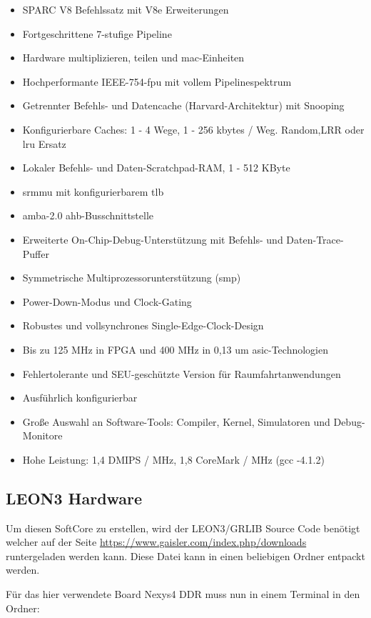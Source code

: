 \begin{itemize}
  \item SPARC V8 Befehlssatz mit V8e Erweiterungen
\item Fortgeschrittene 7-stufige Pipeline
\item Hardware multiplizieren, teilen und \ac{mac}-Einheiten
\item Hochperformante IEEE-754-\ac{fpu} mit vollem Pipelinespektrum
\item Getrennter Befehls- und Datencache (Harvard-Architektur) mit Snooping
\item Konfigurierbare Caches: 1 - 4 Wege, 1 - 256 kbytes / Weg. Random,LRR oder \ac{lru} Ersatz
\item Lokaler Befehls- und Daten-Scratchpad-RAM, 1 - 512 KByte
\item \ac{srmmu} mit konfigurierbarem \ac{tlb}
\item \ac{amba}-2.0 \ac{ahb}-Busschnittstelle
\item Erweiterte On-Chip-Debug-Unterstützung mit Befehls- und Daten-Trace-Puffer
\item Symmetrische Multiprozessorunterstützung (\ac{smp})
\item Power-Down-Modus und Clock-Gating
\item Robustes und vollsynchrones Single-Edge-Clock-Design
\item Bis zu 125 MHz in FPGA und 400 MHz in 0,13 um \ac{asic}-Technologien
\item Fehlertolerante und SEU-geschützte Version für Raumfahrtanwendungen
\item Ausführlich konfigurierbar
\item Große Auswahl an Software-Tools: Compiler, Kernel, Simulatoren und Debug-Monitore
\item Hohe Leistung: 1,4 DMIPS / MHz, 1,8 CoreMark / MHz (gcc -4.1.2)
\end{itemize}

\subsection{LEON3 Hardware}\label{kap:leon3hardware}

Um diesen SoftCore zu erstellen, wird der LEON3/GRLIB Source Code benötigt welcher auf der Seite
\url{https://www.gaisler.com/index.php/downloads} runtergeladen werden kann.
Diese Datei kann in einen beliebigen Ordner entpackt werden.

Für das hier verwendete Board Nexys4 DDR muss nun in einem Terminal in den Ordner:\\

